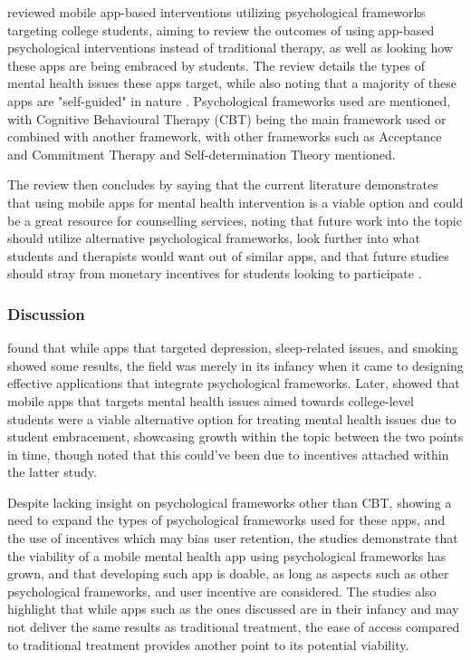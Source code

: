 \documentclass[12pt]{article}
\begin{document}
\textcite{RefWorks:RefID:75-oliveira2021effectiveness} reviewed mobile app-based 
interventions utilizing psychological frameworks targeting college students, aiming to review the outcomes of 
using app-based psychological interventions instead of traditional therapy, as well as looking how these apps are 
being embraced by students. The review details the types of mental health issues these apps target, while also 
noting that a majority of these apps are "self-guided" in nature 
\autocite{RefWorks:RefID:75-oliveira2021effectiveness}. Psychological frameworks used are mentioned, with 
Cognitive Behavioural Therapy (CBT) being 
the main framework used or combined with another framework, with other frameworks such as 
Acceptance and Commitment Therapy and Self-determination Theory mentioned. \newline

The review then concludes by saying that the current literature demonstrates that using mobile apps for mental
health intervention is a viable option and could be a great resource for
counselling services, noting that future work into the topic should utilize alternative psychological
frameworks, look further into what students and therapists would want out of similar apps, and that
future studies should stray from monetary incentives for students looking to participate
\autocite{RefWorks:RefID:75-oliveira2021effectiveness}.

\subsubsection{Discussion}
\textcite{RefWorks:RefID:87-weisel2019standalone} found that while apps that targeted
depression, sleep-related issues, and smoking showed some results, the field was merely in its infancy when it
came to designing effective applications that integrate psychological frameworks. Later, 
\textcite{RefWorks:RefID:75-oliveira2021effectiveness} showed that mobile apps 
that targets mental health issues aimed towards college-level students were a viable alternative option for 
treating mental health issues due to student embracement, showcasing growth within the topic between the two points
in time, though noted that this could've been due to incentives attached within the latter study. \newline

Despite lacking insight on psychological frameworks other than CBT,
showing a need to expand the types of psychological frameworks used for these apps, and the use of incentives 
which may bias user retention, the studies demonstrate that the viability of a mobile mental health app
using psychological frameworks has grown, and that developing such app is doable, as long
as aspects such as other psychological frameworks, and user incentive are considered. The studies also highlight that
while apps such as the ones discussed are in their infancy and may not deliver the same results as traditional treatment, the
ease of access compared to traditional treatment provides another point to its potential viability.
\end{document}

